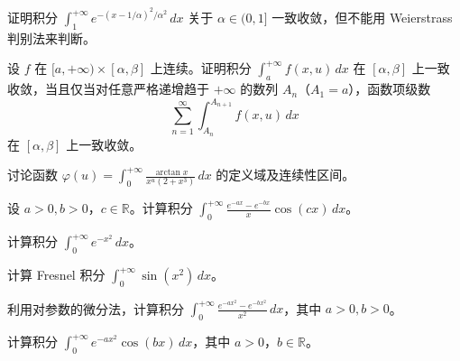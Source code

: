 \noindent\begin{minipage}{\textwidth}
证明积分 $\displaystyle\int_1^{+\infty}e^{-(x-1/\alpha)^2/\alpha^2}\,dx$ 关于 $\alpha\in(0,1]$ 一致收敛，但不能用 Weierstrass 判别法来判断。
\end{minipage}\par\vfill
\newpage
\noindent\begin{minipage}{\textwidth}
设 $f$ 在 $[a,+\infty)\times[\alpha,\beta]$ 上连续。证明积分 $\int_a^{+\infty}f(x,u)\,dx$ 在 $[\alpha,\beta]$ 上一致收敛，当且仅当对任意严格递增趋于 $+\infty$ 的数列 $A_n$（$A_1=a$），函数项级数\[\sum_{n=1}^{\infty}\int_{A_n}^{A_{n+1}}f(x,u)\,dx\]在 $[\alpha,\beta]$ 上一致收敛。
\end{minipage}\par\vfill
\noindent\begin{minipage}{\textwidth}
讨论函数 $\displaystyle\varphi(u)=\int_0^{+\infty}\frac{\arctan x}{x^u(2+x^3)}\,dx$ 的定义域及连续性区间。
\end{minipage}\par\vfill
\noindent\begin{minipage}{\textwidth}
设 $a>0,b>0$，$c\in\mathbb R$。计算积分 $\displaystyle\int_0^{+\infty}\frac{e^{-ax}-e^{-bx}}x\cos(cx)\,dx$。
\end{minipage}\par\vfill
\newpage
\noindent\begin{minipage}{\textwidth}
计算积分 $\displaystyle\int_0^{+\infty}e^{-x^2}\,dx$。
\end{minipage}\par\vfill
\noindent\begin{minipage}{\textwidth}
计算 Fresnel 积分 $\displaystyle\int_0^{+\infty}\sin(x^2)\,dx$。
\end{minipage}\par\vfill
\noindent\begin{minipage}{\textwidth}
利用对参数的微分法，计算积分 $\displaystyle\int_0^{+\infty}\frac{e^{-ax^2}-e^{-bx^2}}{x^2}\,dx$，其中 $a>0,b>0$。
\end{minipage}\par\vfill
\newpage
\noindent\begin{minipage}{\textwidth}
计算积分 $\displaystyle\int_0^{+\infty}e^{-ax^2}\cos(bx)\,dx$，其中 $a>0$，$b\in\mathbb R$。
\end{minipage}\par\vfill
